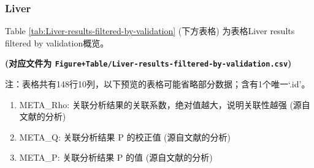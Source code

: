 \documentclass[
]{article}
\providecommand{\tightlist}{%
  \setlength{\itemsep}{0pt}\setlength{\parskip}{0pt}}
\begin{document}
\hypertarget{liver-1}{%
\subsubsection{Liver}\label{liver-1}}

Table \ref{tab:Liver-results-filtered-by-validation} (下方表格) 为表格Liver results filtered by validation概览。

\textbf{(对应文件为 \texttt{Figure+Table/Liver-results-filtered-by-validation.csv})}

\begin{center}\begin{tcolorbox}[colback=gray!10, colframe=gray!50, width=0.9\linewidth, arc=1mm, boxrule=0.5pt]注：表格共有148行10列，以下预览的表格可能省略部分数据；含有1个唯一`.id'。
\end{tcolorbox}
\end{center}
\begin{center}\begin{tcolorbox}[colback=gray!10, colframe=gray!50, width=0.9\linewidth, arc=1mm, boxrule=0.5pt]\begin{enumerate}\tightlist
\item META\_Rho:  关联分析结果的关联系数，绝对值越大，说明关联性越强 (源自文献的分析)
\item META\_Q:  关联分析结果 P 的校正值 (源自文献的分析)
\item META\_P:  关联分析结果 P 的值 (源自文献的分析)
\end{enumerate}\end{tcolorbox}
\end{center}
\end{document}
